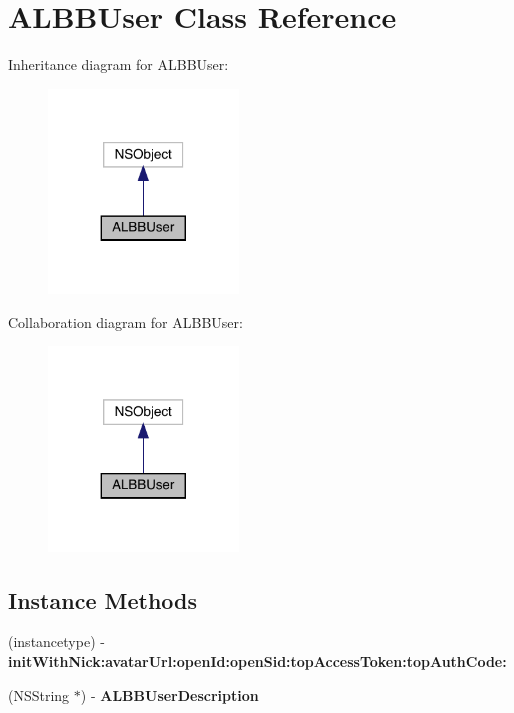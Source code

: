 \hypertarget{interface_a_l_b_b_user}{}\section{A\+L\+B\+B\+User Class Reference}
\label{interface_a_l_b_b_user}


Inheritance diagram for A\+L\+B\+B\+User\+:\nopagebreak
\begin{figure}[H]
\begin{center}
\leavevmode
\includegraphics[width=143pt]{interface_a_l_b_b_user__inherit__graph}
\end{center}
\end{figure}


Collaboration diagram for A\+L\+B\+B\+User\+:\nopagebreak
\begin{figure}[H]
\begin{center}
\leavevmode
\includegraphics[width=143pt]{interface_a_l_b_b_user__coll__graph}
\end{center}
\end{figure}
\subsection*{Instance Methods}
\begin{DoxyCompactItemize}
\item 
\mbox{\label{interface_a_l_b_b_user_afde6e5c462d8959cbc1c3e2921675618}} 
(instancetype) -\/ {\bfseries init\+With\+Nick\+:avatar\+Url\+:open\+Id\+:open\+Sid\+:top\+Access\+Token\+:top\+Auth\+Code\+:}
\item 
\mbox{\label{interface_a_l_b_b_user_ab90a39a74ec11ff7de5f87ca9cc1a3e5}} 
(N\+S\+String $\ast$) -\/ {\bfseries A\+L\+B\+B\+User\+Description}
\end{DoxyCompactItemize}
